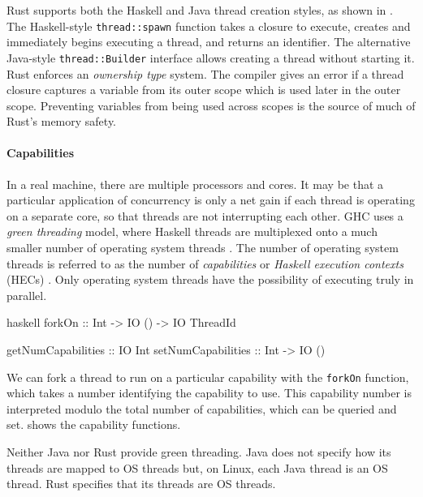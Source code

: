Rust \parencite{rust2011} supports both the Haskell and Java thread creation
styles, as shown in .  The Haskell-style
\verb|thread::spawn| function takes a closure to execute, creates and
immediately begins executing a thread, and returns an identifier.  The
alternative Java-style \verb|thread::Builder| interface allows
creating a thread without starting it.  Rust enforces an
\emph{ownership type} system.  The compiler gives an error if a thread
closure captures a variable from its outer scope which is used later
in the outer scope.  Preventing variables from being used across
scopes is the source of much of Rust's memory safety.

\paragraph{Capabilities}
In a real machine, there are multiple processors and cores.  It may be
that a particular application of concurrency is only a net gain if
each thread is operating on a separate core, so that threads are not
interrupting each other.  GHC uses a \emph{green threading} model,
where Haskell threads are multiplexed onto a much smaller number of
operating system threads \parencite{marlow2009}.  The number of operating
system threads is referred to as the number of \emph{capabilities} or
\emph{Haskell execution contexts} (HECs) \parencite{marlow2009}.  Only
operating system threads have the possibility of executing truly in
parallel.

\begin{listing}
\centering
\begin{cminted}{haskell}
forkOn             :: Int -> IO () -> IO ThreadId

getNumCapabilities :: IO Int
setNumCapabilities :: Int -> IO ()
\end{cminted}
\caption{Operating system threads in Haskell.}\label{lst:caps_haskell}
\end{listing}

We can fork a thread to run on a particular capability with the
\verb|forkOn| function, which takes a number identifying the
capability to use.  This capability number is interpreted modulo the
total number of capabilities, which can be queried and set.
 shows the capability functions.

Neither Java nor Rust provide green threading.  Java does not specify
how its threads are mapped to OS threads but, on Linux, each Java
thread is an OS thread.  Rust specifies that its threads are OS
threads.

